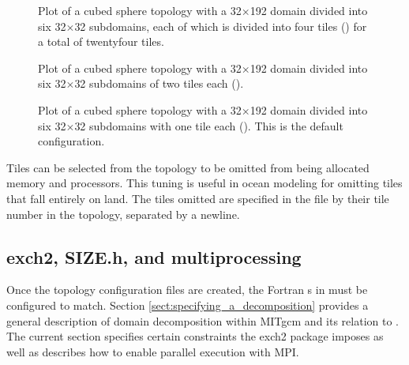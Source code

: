 \begin{figure}
\begin{center}
\end{center} 

\caption{Plot of a cubed sphere topology with a 32$\times$192 domain
divided into six 32$\times$32 subdomains, each of which is divided into four tiles 
() for a total of twentyfour tiles.
} \label{fig:24tile}
\end{figure}

\begin{figure}
\begin{center}
\end{center} 
\caption{Plot of a cubed sphere topology with a 32$\times$192 domain
divided into six 32$\times$32 subdomains of two tiles each
 ().
} \label{fig:12tile}
\end{figure}

\begin{figure}
\begin{center}
\end{center} 
\caption{Plot of a cubed sphere topology with a 32$\times$192 domain
divided into six 32$\times$32 subdomains with one tile each
().  This is the default configuration.
  }
\label{fig:6tile}
\end{figure}


Tiles can be selected from the topology to be omitted from being
allocated memory and processors.  This tuning is useful in ocean
modeling for omitting tiles that fall entirely on land.  The tiles
omitted are specified in the file
by their tile number in the topology, separated by a newline. \\




\subsection{exch2, SIZE.h, and multiprocessing}
\label{sec:exch2mpi}

Once the topology configuration files are created, the Fortran
s in  must be configured to match.
Section \ref{sect:specifying_a_decomposition}  provides a general description of domain
decomposition within MITgcm and its relation to . The
current section specifies certain constraints the exch2 package
imposes as well as describes how to enable parallel execution with
MPI. \\

